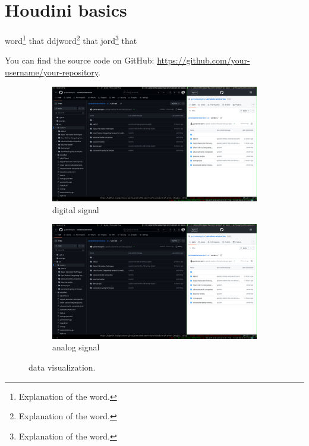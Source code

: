 

\providecommand{\keywords}[1]{\textbf{\textit{Keywords:}} #1}
\section{Houdini basics}

word\footnote{Explanation of the word.} that
ddjword\footnote{Explanation of the word.} that
jord\footnote{Explanation of the word.} that

You can find the source code on GitHub: \url{https://github.com/your-username/your-repository}.



\begin{figure}[H] 
    \centering
    \begin{subfigure}[b]{0.49\textwidth}
        \centering
        \includegraphics[width=1\textwidth]{sections/assignment_1/1.png}
        \caption{digital signal}
    \end{subfigure}
    \hfill
    \begin{subfigure}[b]{0.49\textwidth}
        \centering
        \includegraphics[width=1\textwidth]{sections/assignment_1/1.png}
        \caption{analog signal}
    \end{subfigure}
    \caption{data visualization.}
\end{figure}


